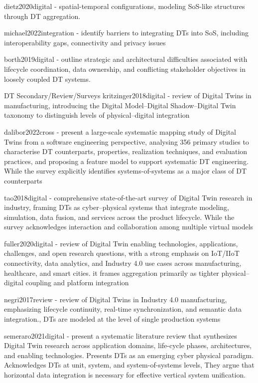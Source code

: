 dietz2020digital - spatial-temporal configurations,  modeling SoS-like structures through DT aggregation.

michael2022integration - identify barriers to integrating DTs into SoS, including interoperability gaps, connectivity and privacy issues

borth2019digital - outline strategic and architectural difficulties associated with lifecycle coordination, data ownership, and conflicting stakeholder objectives in loosely coupled DT systems.



DT
Secondary/Review/Surveys
kritzinger2018digital - review of Digital Twins in manufacturing, introducing the Digital Model–Digital Shadow–Digital Twin taxonomy to distinguish levels of physical–digital integration

dalibor2022cross - present a large-scale systematic mapping study of Digital Twins from a software engineering perspective, analysing 356 primary studies to characterise DT counterparts, properties, realization techniques, and evaluation practices, and proposing a feature model to support systematic DT engineering. While the survey explicitly identifies systems-of-systems as a major class of DT counterparts

tao2018digital -  comprehensive state-of-the-art survey of Digital Twin research in industry, framing DTs as cyber–physical systems that integrate modeling, simulation, data fusion, and services across the product lifecycle. While the survey acknowledges interaction and collaboration among multiple virtual models

fuller2020digital - review of Digital Twin enabling technologies, applications, challenges, and open research questions, with a strong emphasis on IoT/IIoT connectivity, data analytics, and Industry 4.0 use cases across manufacturing, healthcare, and smart cities. it frames aggregation primarily as tighter physical–digital coupling and platform integration

negri2017review - review of Digital Twins in Industry 4.0 manufacturing, emphasizing lifecycle continuity, real-time synchronization, and semantic data integration., DTs are modeled at the level of single production systems

semeraro2021digital - present a systematic literature review that synthesizes Digital Twin research across application domains, life-cycle phases, architectures, and enabling technologies. Presents DTs as an emerging cyber physical paradigm. Acknowledges DTs at unit, system, and system-of-systems levels, They argue that horizontal data integration is necessary for effective vertical system unification.

